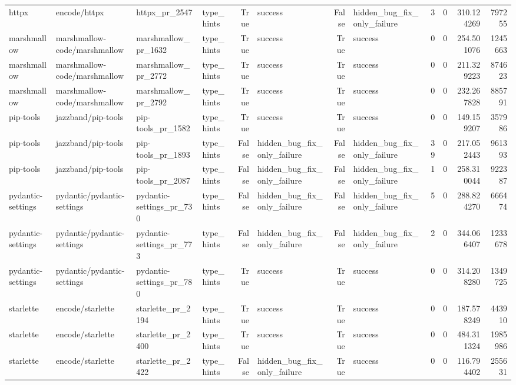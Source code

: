 \begin{tabular}{llllrlrlrrrr}
httpx & encode/httpx & httpx\_pr\_2547 & type\_hints & True & success & False & hidden\_bug\_fix\_only\_failure & 3 & 0 & 310.124269 & 797255 \\
marshmallow & marshmallow-code/marshmallow & marshmallow\_pr\_1632 & type\_hints & True & success & True & success & 0 & 0 & 254.501076 & 1245663 \\
marshmallow & marshmallow-code/marshmallow & marshmallow\_pr\_2772 & type\_hints & True & success & True & success & 0 & 0 & 211.329223 & 874623 \\
marshmallow & marshmallow-code/marshmallow & marshmallow\_pr\_2792 & type\_hints & True & success & True & success & 0 & 0 & 232.267828 & 885791 \\
pip-tools & jazzband/pip-tools & pip-tools\_pr\_1582 & type\_hints & True & success & True & success & 0 & 0 & 149.159207 & 357986 \\
pip-tools & jazzband/pip-tools & pip-tools\_pr\_1893 & type\_hints & False & hidden\_bug\_fix\_only\_failure & False & hidden\_bug\_fix\_only\_failure & 39 & 0 & 217.052443 & 961393 \\
pip-tools & jazzband/pip-tools & pip-tools\_pr\_2087 & type\_hints & False & hidden\_bug\_fix\_only\_failure & False & hidden\_bug\_fix\_only\_failure & 1 & 0 & 258.310044 & 922387 \\
pydantic-settings & pydantic/pydantic-settings & pydantic-settings\_pr\_730 & type\_hints & False & hidden\_bug\_fix\_only\_failure & False & hidden\_bug\_fix\_only\_failure & 5 & 0 & 288.824270 & 666474 \\
pydantic-settings & pydantic/pydantic-settings & pydantic-settings\_pr\_773 & type\_hints & False & hidden\_bug\_fix\_only\_failure & False & hidden\_bug\_fix\_only\_failure & 2 & 0 & 344.066407 & 1233678 \\
pydantic-settings & pydantic/pydantic-settings & pydantic-settings\_pr\_780 & type\_hints & True & success & True & success & 0 & 0 & 314.208280 & 1349725 \\
starlette & encode/starlette & starlette\_pr\_2194 & type\_hints & True & success & True & success & 0 & 0 & 187.578249 & 443910 \\
starlette & encode/starlette & starlette\_pr\_2400 & type\_hints & True & success & True & success & 0 & 0 & 484.311324 & 1985986 \\
starlette & encode/starlette & starlette\_pr\_2422 & type\_hints & False & hidden\_bug\_fix\_only\_failure & True & success & 0 & 0 & 116.794402 & 255631 \\

\end{tabular}
